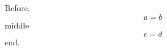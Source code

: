 \documentclass[10pt]{article}
\begin{document}
Before.
\begin{equation} a = b \tag{A} \end{equation}
middle
\begin{equation} c = d \tag*{B.1} \end{equation}
end.
\end{document}

